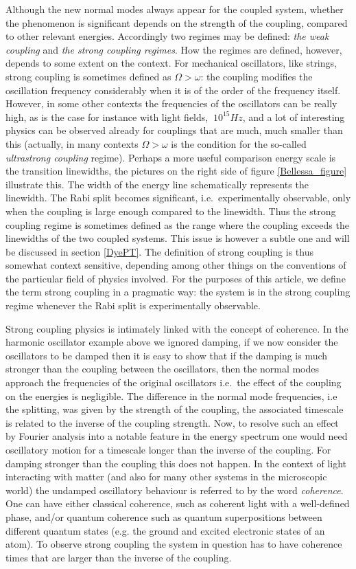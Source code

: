 \documentclass[12pt]{iopart}
\begin{document}
Although the new normal modes always appear for the coupled system, whether the phenomenon is significant depends on the strength of the coupling, compared to other relevant energies. Accordingly two regimes may be defined: {\it the weak coupling} and {\it the strong coupling regimes}. How the regimes are defined, however, depends to some extent on the context. For mechanical oscillators, like strings, strong coupling is sometimes defined as $\Omega > \omega$: the coupling modifies the oscillation frequency considerably when it is of the order of the frequency itself. However, in some other contexts the frequencies of the oscillators can be really high, as is the case for instance with light fields, $~10^{15}Hz$, and a lot of interesting physics can be observed already for couplings that are much, much smaller than this (actually, in many contexts $\Omega > \omega$ is the condition for the so-called {\it ultrastrong coupling} regime). Perhaps a more useful comparison energy scale is the transition linewidths, the pictures on the right side of figure \ref{Bellessa_figure} illustrate this. The width of the energy line schematically represents the linewidth. The Rabi split becomes significant, i.e.\ experimentally observable, only when the coupling is large enough compared to the linewidth. Thus the strong coupling regime is sometimes defined as the range where the coupling exceeds the linewidths of the two coupled systems. This issue is however a subtle one and will be discussed in section \ref{DyePT}. The definition of strong coupling is thus somewhat context sensitive, depending among other things on the conventions of the particular field of physics involved. For the purposes of this article, we define the term strong coupling in a pragmatic way: the system is in the strong coupling regime whenever the Rabi split is experimentally observable.     

Strong coupling physics is intimately linked with the concept of coherence. In the harmonic oscillator example above we ignored damping, if we now consider the oscillators to be damped then it is easy to show that if the damping is much stronger than the coupling between the oscillators, then the normal modes approach the frequencies of the original oscillators i.e.\ the effect of the coupling on the energies is negligible. The difference in the normal mode frequencies, i.e the splitting, was given by the strength of the coupling, the associated timescale is related to the inverse of the coupling strength. Now, to resolve such an effect by Fourier analysis into a notable feature in the energy spectrum one would need oscillatory motion for a timescale longer than the inverse of the coupling. For damping stronger than the coupling this does not happen. In the context of light interacting with matter (and also for many other systems in the microscopic world) the undamped oscillatory behaviour is referred to by the word {\it coherence}. One can have either classical coherence, such as coherent light with a well-defined phase, 
and/or quantum coherence such as quantum superpositions between different quantum states (e.g. the ground and excited electronic states of an atom). To observe strong coupling the system in question has to have coherence times that are larger than the inverse of the coupling. 
\end{document}
